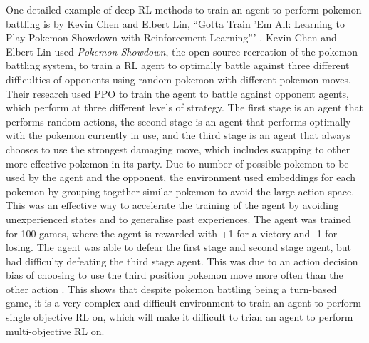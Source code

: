 One detailed example of deep RL methods to train an agent to perform pokemon battling is by Kevin Chen and Elbert Lin, ``Gotta Train 'Em All: Learning to Play Pokemon Showdown with Reinforcement Learning''' \cite{chen2018gotta}. Kevin Chen and Elbert Lin used \textit{Pokemon Showdown}, the open-source recreation of the pokemon battling system, to train a RL agent to optimally battle against three different difficulties of opponents using random pokemon with different pokemon moves. Their research used PPO to train the agent to battle against opponent agents, which perform at three different levels of strategy. The first stage is an agent that performs random actions, the second stage is an agent that performs optimally with the pokemon currently in use, and the third stage is an agent that always chooses to use the strongest damaging move, which includes swapping to other more effective pokemon in its party. Due to number of possible pokemon to be used by the agent and the opponent, the environment used embeddings for each pokemon by grouping together similar pokemon to avoid the large action space. This was an effective way to accelerate the training of the agent by avoiding unexperienced states and to generalise past experiences. The agent was trained for 100 games, where the agent is rewarded with +1 for a victory and -1 for losing. The agent was able to defear the first stage and second stage agent, but had difficulty defeating the third stage agent. This was due to an action decision bias of choosing to use the third position pokemon move more often than the other action \cite{chen2018gotta}. This shows that despite pokemon battling being a turn-based game, it is a very complex and difficult environment to train an agent to perform single objective RL on, which will make it difficult to trian an agent to perform multi-objective RL on. 

